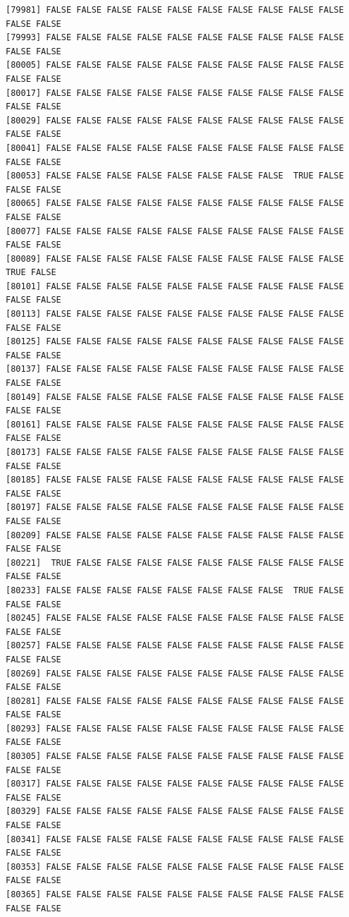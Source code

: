 \documentclass[
  a4paper,
  DIV=11,
  numbers=noendperiod]{scrartcl}
\begin{document}
\begin{verbatim}
[79981] FALSE FALSE FALSE FALSE FALSE FALSE FALSE FALSE FALSE FALSE FALSE FALSE
[79993] FALSE FALSE FALSE FALSE FALSE FALSE FALSE FALSE FALSE FALSE FALSE FALSE
[80005] FALSE FALSE FALSE FALSE FALSE FALSE FALSE FALSE FALSE FALSE FALSE FALSE
[80017] FALSE FALSE FALSE FALSE FALSE FALSE FALSE FALSE FALSE FALSE FALSE FALSE
[80029] FALSE FALSE FALSE FALSE FALSE FALSE FALSE FALSE FALSE FALSE FALSE FALSE
[80041] FALSE FALSE FALSE FALSE FALSE FALSE FALSE FALSE FALSE FALSE FALSE FALSE
[80053] FALSE FALSE FALSE FALSE FALSE FALSE FALSE FALSE  TRUE FALSE FALSE FALSE
[80065] FALSE FALSE FALSE FALSE FALSE FALSE FALSE FALSE FALSE FALSE FALSE FALSE
[80077] FALSE FALSE FALSE FALSE FALSE FALSE FALSE FALSE FALSE FALSE FALSE FALSE
[80089] FALSE FALSE FALSE FALSE FALSE FALSE FALSE FALSE FALSE FALSE  TRUE FALSE
[80101] FALSE FALSE FALSE FALSE FALSE FALSE FALSE FALSE FALSE FALSE FALSE FALSE
[80113] FALSE FALSE FALSE FALSE FALSE FALSE FALSE FALSE FALSE FALSE FALSE FALSE
[80125] FALSE FALSE FALSE FALSE FALSE FALSE FALSE FALSE FALSE FALSE FALSE FALSE
[80137] FALSE FALSE FALSE FALSE FALSE FALSE FALSE FALSE FALSE FALSE FALSE FALSE
[80149] FALSE FALSE FALSE FALSE FALSE FALSE FALSE FALSE FALSE FALSE FALSE FALSE
[80161] FALSE FALSE FALSE FALSE FALSE FALSE FALSE FALSE FALSE FALSE FALSE FALSE
[80173] FALSE FALSE FALSE FALSE FALSE FALSE FALSE FALSE FALSE FALSE FALSE FALSE
[80185] FALSE FALSE FALSE FALSE FALSE FALSE FALSE FALSE FALSE FALSE FALSE FALSE
[80197] FALSE FALSE FALSE FALSE FALSE FALSE FALSE FALSE FALSE FALSE FALSE FALSE
[80209] FALSE FALSE FALSE FALSE FALSE FALSE FALSE FALSE FALSE FALSE FALSE FALSE
[80221]  TRUE FALSE FALSE FALSE FALSE FALSE FALSE FALSE FALSE FALSE FALSE FALSE
[80233] FALSE FALSE FALSE FALSE FALSE FALSE FALSE FALSE  TRUE FALSE FALSE FALSE
[80245] FALSE FALSE FALSE FALSE FALSE FALSE FALSE FALSE FALSE FALSE FALSE FALSE
[80257] FALSE FALSE FALSE FALSE FALSE FALSE FALSE FALSE FALSE FALSE FALSE FALSE
[80269] FALSE FALSE FALSE FALSE FALSE FALSE FALSE FALSE FALSE FALSE FALSE FALSE
[80281] FALSE FALSE FALSE FALSE FALSE FALSE FALSE FALSE FALSE FALSE FALSE FALSE
[80293] FALSE FALSE FALSE FALSE FALSE FALSE FALSE FALSE FALSE FALSE FALSE FALSE
[80305] FALSE FALSE FALSE FALSE FALSE FALSE FALSE FALSE FALSE FALSE FALSE FALSE
[80317] FALSE FALSE FALSE FALSE FALSE FALSE FALSE FALSE FALSE FALSE FALSE FALSE
[80329] FALSE FALSE FALSE FALSE FALSE FALSE FALSE FALSE FALSE FALSE FALSE FALSE
[80341] FALSE FALSE FALSE FALSE FALSE FALSE FALSE FALSE FALSE FALSE FALSE FALSE
[80353] FALSE FALSE FALSE FALSE FALSE FALSE FALSE FALSE FALSE FALSE FALSE FALSE
[80365] FALSE FALSE FALSE FALSE FALSE FALSE FALSE FALSE FALSE FALSE FALSE FALSE

\end{verbatim}
\end{document}
